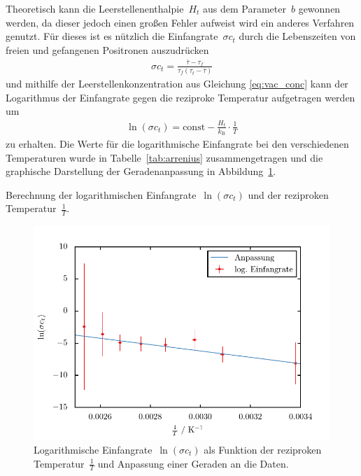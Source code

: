 \documentclass[11pt, a4paper]{article}
\numberwithin{equation}{section}
\begin{document}
Theoretisch kann die Leerstellenenthalpie~$H_t$ aus dem Parameter~$b$ gewonnen werden, da dieser jedoch einen großen Fehler aufweist wird ein anderes Verfahren genutzt.
Für dieses ist es nützlich die Einfangrate~$\sigma c_t$ durch die Lebenszeiten von freien und gefangenen Positronen auszudrücken \cite{add_infos}
\begin{align*}
	\sigma c_t = \frac{\bar{\tau} - \tau_f}{\tau_f (\tau_t - \bar{\tau})}
\end{align*}
und mithilfe der Leerstellenkonzentration aus Gleichung \eqref{eq:vac_conc} kann der Logarithmus der Einfangrate gegen die reziproke Temperatur aufgetragen werden um
\begin{align}
	\ln(\sigma c_t) = \mathrm{const} - \frac{H_t}{k_\mathrm{B}} \cdot \frac{1}{T} \label{eq:logogogogo}
\end{align}
zu erhalten.
Die Werte für die logarithmische Einfangrate bei den verschiedenen Temperaturen wurde in Tabelle~\ref{tab:arrenius} zusammengetragen und die graphische Darstellung der Geradenanpassung in Abbildung~\ref{fig:arrenius}.
\begin{table}[h]
	\centering
	
	\caption{Berechnung der logarithmischen Einfangrate~$\ln(\sigma c_t)$ und der reziproken Temperatur~$\frac{1}{T}$.}
	\label{tab:arrenius}
\end{table}
\begin{figure}[h]
	\centering
	\includegraphics{./figures/arrenius.pdf}
	\caption{Logarithmische Einfangrate~$\ln(\sigma c_t)$ als Funktion der reziproken Temperatur~$\frac{1}{T}$ und Anpassung einer Geraden an die Daten.}
	\label{fig:arrenius}
\end{figure}
\end{document}
